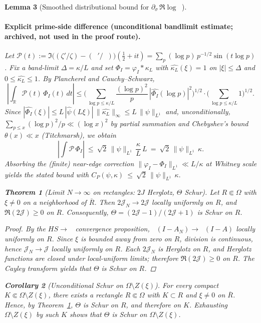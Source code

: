 \documentclass[11pt]{article}
\newtheorem{theorem}{Theorem}
\newtheorem{lemma}[theorem]{Lemma}
\newtheorem{corollary}[theorem]{Corollary}
\theoremstyle{definition}
\theoremstyle{remark}
\newcommand{\R}{\mathbb{R}}
\DeclareMathOperator{\dettwo}{det_2}
\begin{document}
\begin{lemma}[Smoothed distributional bound for $\partial_\sigma\,\Re\log\dettwo$]
\paragraph{Explicit prime-side difference (unconditional bandlimit estimate; archived, not used in the proof route).}
Let $\mathcal P(t):=\Im\big((\zeta'/\zeta)-(\dettwo'/\dettwo)\big)(\tfrac12+it)=\sum_{p}(\log p)\,p^{-1/2}\sin(t\log p)$. Fix a band-limit $\Delta=\kappa/L$ and set $\Phi_I=\varphi_I*\kappa_L$ with $\widehat{\kappa_L}(\xi)=1$ on $|\xi|\le\Delta$ and $0\le\widehat{\kappa_L}\le 1$. By Plancherel and Cauchy–Schwarz,
\[
 \left|\int_\R \!\mathcal P(t)\,\Phi_I(t)\,dt\right|
 \le \Bigg(\sum_{\log p\le \kappa/L}\frac{(\log p)^2}{p}\,|\widehat{\Phi_I}(\log p)|^2\Bigg)^{\!1/2}
 \cdot\Bigg(\sum_{\log p\le \kappa/L}1\Bigg)^{\!1/2}.
\]
Since $|\widehat{\Phi_I}(\xi)|\le L\,|\widehat{\psi}(L\xi)|\,\|\widehat{\kappa_L}\|_\infty\le L\,\|\psi\|_{L^1}$ and, unconditionally, $\sum_{p\le x}(\log p)^2/p\ll (\log x)^2$ by partial summation and Chebyshev's bound $\theta(x)\ll x$ (Titchmarsh), we obtain
\[
 \left|\int \!\mathcal P\,\Phi_I\right|\ \le\ \sqrt{2}\,\|\psi\|_{L^1}\,\frac{\kappa}{L}\,L\ =\ \sqrt{2}\,\|\psi\|_{L^1}\,\kappa.
\]
Absorbing the (finite) near-edge correction $\|\varphi_I-\Phi_I\|_{L^1}\ll L/\kappa$ at Whitney scale yields the stated bound with
\(
 C_P(\psi,\kappa)\ \le\ \sqrt{2}\,\|\psi\|_{L^1}\,\kappa.
\)
\begin{theorem}[Limit \(N\to\infty\) on rectangles: \(2J\) Herglotz, \(\Theta\) Schur]\label{thm:limit-rect}
Let \(R\Subset\Omega\) with \(\xi\neq 0\) on a neighborhood of \(\overline R\). Then \(2\mathcal J_N\to 2\mathcal J\) locally uniformly on \(R\), and \(\Re(2\mathcal J)\ge 0\) on \(R\). Consequently, \(\Theta=(2\mathcal J-1)/(2\mathcal J+1)\) is Schur on \(R\).
\end{theorem}
\begin{proof}
By the \(HS\to\dettwo\) convergence proposition, $\dettwo(I-A_N)\to \dettwo(I-A)$ locally uniformly on $R$. Since $\xi$ is bounded away from zero on $R$, division is continuous, hence $\mathcal J_N\to \mathcal J$ locally uniformly on $R$. Each $2\mathcal J_N$ is Herglotz on $R$, and Herglotz functions are closed under local-uniform limits; therefore $\Re(2\mathcal J)\ge 0$ on $R$. The Cayley transform yields that $\Theta$ is Schur on $R$.
\end{proof}
\begin{corollary}[Unconditional Schur on \(\Omega\setminus Z(\xi)\)]\label{cor:Schur-off-zeros}
For every compact \(K\Subset \Omega\setminus Z(\xi)\), there exists a rectangle \(R\Subset\Omega\) with \(K\subset R\) and \(\xi\neq 0\) on \(\overline R\). Hence, by Theorem~\ref{thm:limit-rect}, \(\Theta\) is Schur on \(R\), and therefore on \(K\). Exhausting \(\Omega\setminus Z(\xi)\) by such \(K\) shows that \(\Theta\) is Schur on \(\Omega\setminus Z(\xi)\).

\end{corollary}
\end{lemma}
\end{document}
